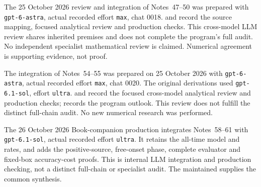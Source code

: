 The 25 October 2026 review and integration of Notes~47--50 was prepared
with \texttt{gpt-6-astra}, actual recorded effort \texttt{max}, chat 0018.
and 
record the source mapping, focused analytical review and production checks.
This cross-model LLM review shares inherited premises and does not complete
the program's full audit. No independent specialist mathematical review
is claimed. Numerical agreement is supporting evidence, not proof.

The integration of Notes~54--55 was prepared on 25 October 2026 with
\texttt{gpt-6-astra}, actual recorded effort \texttt{max}, chat 0020.
The original derivations used \texttt{gpt-6.1-sol}, effort \texttt{ultra}.
and 
record the focused cross-model analytical review and production checks;
records the program outlook. This review does not fulfill the distinct
full-chain audit. No new numerical research was performed.

The 26 October 2026 Book-companion production integrates Notes~58--61
with \texttt{gpt-6.1-sol}, actual recorded effort \texttt{ultra}.
It retains the all-time model and rates, and adds the positive-source,
free-onset phase, complete evaluator and fixed-box accuracy-cost proofs.
This is internal LLM integration and production checking, not a distinct
full-chain or specialist audit. The maintained
 supplies the common synthesis.

